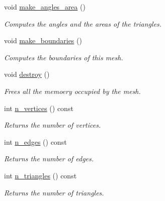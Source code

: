 \begin{DoxyCompactItemize}
void \hyperlink{classgeoproc_1_1TriangleMesh_a4657d7986fd9905c3a7b759e3d1b5442}{make\+\_\+angles\+\_\+area} ()
\begin{DoxyCompactList}\small\item\em Computes the angles and the areas of the triangles. \end{DoxyCompactList}\item 
void \hyperlink{classgeoproc_1_1TriangleMesh_ad11c9406e2677e4d72d53837206fd769}{make\+\_\+boundaries} ()
\begin{DoxyCompactList}\small\item\em Computes the boundaries of this mesh. \end{DoxyCompactList}\item 
void \hyperlink{classgeoproc_1_1TriangleMesh_abc27a4416e1d33b8718c4afb77a8acf5}{destroy} ()
\begin{DoxyCompactList}\small\item\em Frees all the memoery occupied by the mesh. \end{DoxyCompactList}\item 
\mbox{\label{classgeoproc_1_1TriangleMesh_aa36cc7e86835794dcbbb3d823b4a39ac}} 
int \hyperlink{classgeoproc_1_1TriangleMesh_aa36cc7e86835794dcbbb3d823b4a39ac}{n\+\_\+vertices} () const
\begin{DoxyCompactList}\small\item\em Returns the number of vertices. \end{DoxyCompactList}\item 
\mbox{\label{classgeoproc_1_1TriangleMesh_afdc430c1b3943895f85be7224b580ed6}} 
int \hyperlink{classgeoproc_1_1TriangleMesh_afdc430c1b3943895f85be7224b580ed6}{n\+\_\+edges} () const
\begin{DoxyCompactList}\small\item\em Returns the number of edges. \end{DoxyCompactList}\item 
\mbox{\label{classgeoproc_1_1TriangleMesh_ac6db86ebd1e12d187f4bd4fcbb1e0809}} 
int \hyperlink{classgeoproc_1_1TriangleMesh_ac6db86ebd1e12d187f4bd4fcbb1e0809}{n\+\_\+triangles} () const
\begin{DoxyCompactList}\small\item\em Returns the number of triangles. \end{DoxyCompactList}\item 

\end{DoxyCompactItemize}

